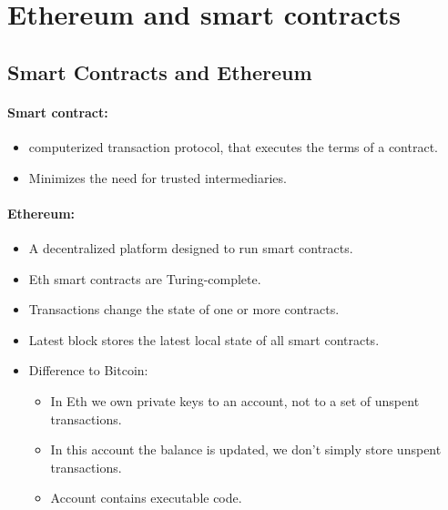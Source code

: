 \section{Ethereum and smart contracts}
\subsection{Smart Contracts and Ethereum}

\paragraph{Smart contract:}
\begin{itemize}
    \item computerized transaction protocol, that executes the terms of a contract.
    \item Minimizes the need for trusted intermediaries.
\end{itemize}{}

\paragraph{Ethereum:}
\begin{itemize}
    \item A decentralized platform designed to run smart contracts.
    \item Eth smart contracts are Turing-complete.
    \item Transactions change the state of one or more contracts.
    \item Latest block stores the latest local state of all smart contracts.
    \item Difference to Bitcoin:
    \begin{itemize}
        \item In Eth we own private keys to an account, not to a set of unspent transactions.
        \item In this account the balance is updated, we don't simply store unspent transactions.
        \item Account contains executable code.
    \end{itemize}{}
\end{itemize}{}


